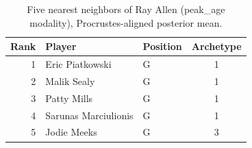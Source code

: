 \begin{table}[htbp]
  \centering\small
  \begin{tabular}{rllc}
    \toprule
    Rank & Player & Position & Archetype \\
    \midrule
    1 & Eric Piatkowski & G & 1 \\
    2 & Malik Sealy & G & 1 \\
    3 & Patty Mills & G & 1 \\
    4 & Sarunas Marciulionis & G & 1 \\
    5 & Jodie Meeks & G & 3 \\
    \bottomrule
  \end{tabular}
  \caption{Five nearest neighbors of Ray Allen (peak_age modality), Procrustes-aligned posterior mean.}
  \label{tab:Ray_Allen_neighbors_peak_age}
\end{table}

